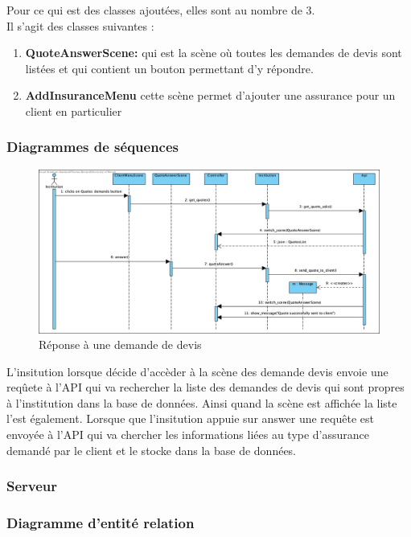 \documentclass[../rapport.tex]{subfiles}
\begin{document}
		\medskip

		Pour ce qui est des classes ajoutées, elles sont au nombre de 3.\\
		Il s'agit des classes suivantes :
		\begin{enumerate}
				\item \textbf{QuoteAnswerScene:} qui est la scène où toutes les demandes de devis
						sont listées et qui contient un bouton permettant d'y répondre.
				\item \textbf{AddInsuranceMenu} cette scène permet d'ajouter une assurance pour
						un client en particulier
		\end{enumerate} 
\newpage
		\subsubsection{Diagrammes de séquences}
				\begin{figure}[h]
						\centering\includegraphics[scale=0.3]{ressources/photos_diagrammes/extensionThomas/reponseDevis.jpg}
						\caption{Réponse à une demande de devis}
				\end{figure}

				L'insitution lorsque décide d'accèder à la scène des demande devis envoie une
				reqûete à l'API qui va rechercher la liste des demandes de devis qui sont propres
				à l'institution dans la base de données. Ainsi quand la scène est affichée la 
				liste l'est également. Lorsque que l'insitution appuie sur answer une requête est
				envoyée à l'API qui va chercher les informations liées au type d'assurance demandé
				par le client et le stocke dans la base de données.
		\subsubsection{Serveur}
		\subsubsection{Diagramme d'entité relation}
\end{document}
